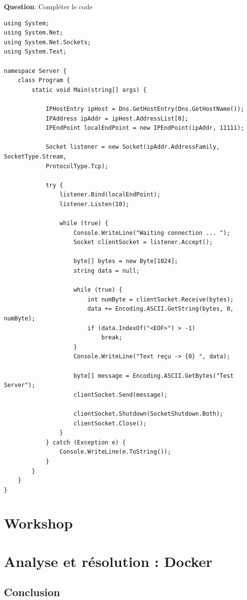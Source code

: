 \newpage

\noindent \textbf{Question}: Compléter le code

\begin{verbatim}
using System;
using System.Net;
using System.Net.Sockets;
using System.Text;

namespace Server {
	class Program {
		static void Main(string[] args) {

			IPHostEntry ipHost = Dns.GetHostEntry(Dns.GetHostName());
			IPAddress ipAddr = ipHost.AddressList[0];
			IPEndPoint localEndPoint = new IPEndPoint(ipAddr, 11111);

			Socket listener = new Socket(ipAddr.AddressFamily, SocketType.Stream,
			ProtocolType.Tcp);

			try {
				listener.Bind(localEndPoint);
				listener.Listen(10);

				while (true) {
					Console.WriteLine("Waiting connection ... ");
					Socket clientSocket = listener.Accept();

					byte[] bytes = new Byte[1024];
					string data = null;

					while (true) {
						int numByte = clientSocket.Receive(bytes);
						data += Encoding.ASCII.GetString(bytes, 0, numByte);
						if (data.IndexOf("<EOF>") > -1)
							break;
					}
					Console.WriteLine("Text reçu -> {0} ", data);

					byte[] message = Encoding.ASCII.GetBytes("Test Server");
					clientSocket.Send(message);

					clientSocket.Shutdown(SocketShutdown.Both);
					clientSocket.Close();
				}
			} catch (Exception e) {
				Console.WriteLine(e.ToString());
			}
		}
	}
}
\end{verbatim}

\section*{Workshop}

\newpage

\section*{Analyse et résolution : Docker}

\subsection*{Conclusion}
{}

